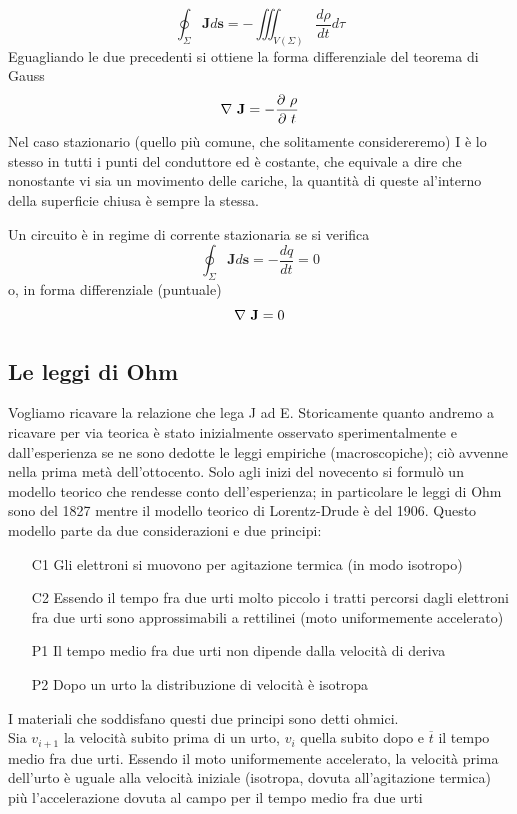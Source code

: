 \documentclass[
10pt, %
a4paper, %
oneside, %
headinclude,footinclude, %
BCOR5mm, %
]{scrartcl}
\begin{document}
\[\oint_\Sigma \mathbf{J}d\mathbf{s} = -\iiint_{V(\Sigma)}\frac{d\rho}{dt}d\tau\]
Eguagliando le due precedenti si ottiene la forma differenziale del teorema di Gauss
\[\mathbf{\nabla\ }\mathbf{J} = -\frac{\partial\ \rho}{\partial\  t}\]
Nel caso stazionario (quello più comune, che solitamente considereremo) I è lo stesso in tutti i punti del conduttore ed è costante, che equivale a dire che nonostante vi sia un movimento delle cariche, la quantità di queste al'interno della superficie chiusa è sempre la stessa. 
\begin{definizione}\label{def:corrente_stazionaria}
	Un circuito è in regime di corrente stazionaria se si verifica
	\[\oint_\Sigma \mathbf{J}d\mathbf{s} = -\frac{dq}{dt} = 0\]
	o, in forma differenziale (puntuale)
	\[\nabla\  \mathbf{J}=0\]
\end{definizione}
\subsection{Le leggi di Ohm}
Vogliamo ricavare la relazione che lega J ad E. Storicamente quanto andremo a ricavare per via teorica è stato inizialmente osservato sperimentalmente e dall'esperienza se ne sono dedotte le leggi empiriche (macroscopiche); ciò avvenne nella prima metà dell'ottocento. Solo agli inizi del novecento si formulò un modello teorico che rendesse conto dell'esperienza; in particolare le leggi di Ohm sono del 1827 mentre il modello teorico di Lorentz-Drude è del 1906. Questo modello parte da due considerazioni e due principi:
\begin{itemize}
	\item[C1] Gli elettroni si muovono per agitazione termica (in modo isotropo)
	\item[C2] Essendo il tempo fra due urti molto piccolo i tratti percorsi dagli elettroni fra due urti sono approssimabili a rettilinei (moto uniformemente accelerato)
	\item[P1] Il tempo medio fra due urti non dipende dalla velocità di deriva
	\item[P2] Dopo un urto la distribuzione di velocità è isotropa
\end{itemize}
I materiali che soddisfano questi due principi sono detti ohmici.\\
Sia \(v_{i+1}\) la velocità subito prima di un urto, \(v_i\) quella subito dopo e $\overline{t}$ il tempo medio fra due urti. Essendo il moto uniformemente accelerato, la velocità prima dell'urto è uguale alla velocità iniziale (isotropa, dovuta all'agitazione termica) più l'accelerazione dovuta al campo per il tempo medio fra due urti
\end{document}
